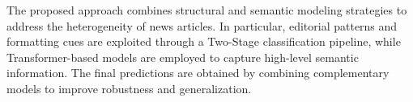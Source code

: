 The proposed approach combines structural and semantic modeling strategies to address the heterogeneity of news articles. In particular, editorial patterns and formatting cues are exploited through a Two-Stage classification pipeline, while Transformer-based models are employed to capture high-level semantic information. The final predictions are obtained by combining complementary models to improve robustness and generalization.

